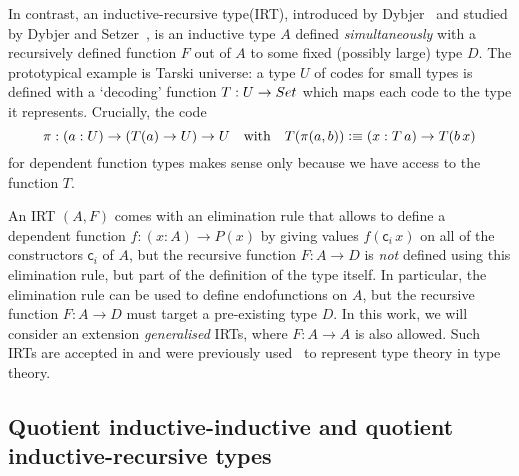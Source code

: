\documentclass[a4paper,UKenglish,numberwithinsect,cleveref,thm-restate]{lipics-v2021}
\newcommand{\LT}[2][]{\todo[inline,author={L-T},caption={},color={pink},#1]{#2}}
\begin{document}
In contrast, an inductive-recursive type(IRT), introduced by Dybjer~\cite{Dybjer2000} and studied by Dybjer and Setzer~\cite{Dybjer1999,Dybjer2003}, is an inductive type $A$ defined \emph{simultaneously} with a recursively defined function $F$ out of $A$ to some fixed (possibly large) type $D$.
The prototypical example is Tarski universe: a type $U$ of codes for small types is defined with a `decoding' function $T : U \to \Set$ which maps each code to the type it represents. Crucially, the code
\[
  \pi : (a : U) \to (T(a) \to U) \to U
  \quad\text{with}\quad T(\pi(a, b)) \vcentcolon\equiv (x : T\,a) \to T(b\, x)
\]
for dependent function types makes sense only because we have access to the function $T$.
%

An IRT $(A, F)$ comes with an elimination rule that allows to define a dependent function  $f : (x : A) \to P(x)$ by giving values $f(\mathsf{c}_i\,x)$ on all of the constructors $\mathsf{c}_i$ of $A$, but the recursive function $F : A \to D$ is \emph{not} defined using this elimination rule, but part of the definition of the type itself.
%
In particular, the elimination rule can be used to define endofunctions on $A$, but the recursive function  $F : A \to D$ must target a pre-existing type $D$.
%
In this work, we will consider an extension \emph{generalised} IRTs, where $F : A \to A$ is also allowed.
%
Such IRTs are accepted in \Agda and were previously used~\cite{Danielsson2006} to represent type theory in type theory.
%



\subsection{Quotient inductive-inductive and quotient inductive-recursive types}
\end{document}
